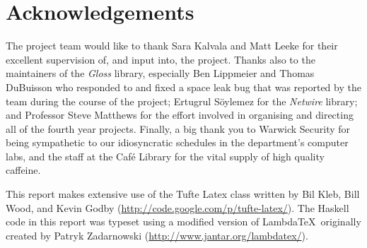 \chapter{Acknowledgements}

\begin{fullwidth}

The project team would like to thank Sara Kalvala and Matt Leeke for their excellent supervision of, and input into, the project. Thanks also to the maintainers of the \emph{Gloss} library, especially Ben Lippmeier and Thomas DuBuisson who responded to and fixed a space leak bug that was reported by the team during the course of the project; Ertugrul S\"oylemez for the \emph{Netwire} library; and Professor Steve Matthews for the effort involved in organising and directing all of the fourth year projects. Finally, a big thank you to Warwick Security for being sympathetic to our idiosyncratic schedules in the department's computer labs, and the staff at the Caf\'e Library for the vital supply of high quality caffeine. 

\vspace{1em}\noindent
This report makes extensive use of the Tufte Latex class written by Bil Kleb, Bill Wood, and Kevin Godby (\url{http://code.google.com/p/tufte-latex/}). 
The Haskell code in this report was typeset using a modified version of Lambda\TeX\ originally created by Patryk Zadarnowski (\url{http://www.jantar.org/lambdatex/}).

\end{fullwidth}
